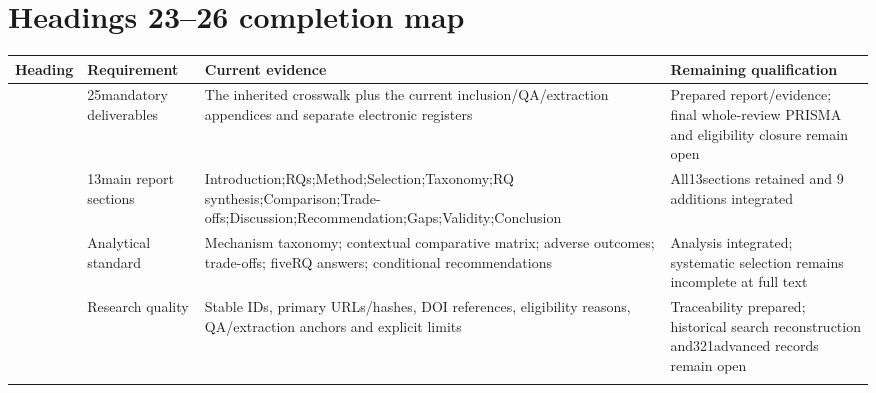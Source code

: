 \clearpage\section{Headings 23--26 completion map}
\begin{longtable}{>{\raggedright\arraybackslash}p{}>{\raggedright\arraybackslash}p{}>{\raggedright\arraybackslash}p{}>{\raggedright\arraybackslash}p{}}
\toprule
\textbf{Heading} & \textbf{Requirement} & \textbf{Current evidence} & \textbf{Remaining qualification}\\\midrule\endhead
23 & 25mandatory deliverables & The inherited crosswalk plus the current inclusion/QA/extraction appendices and separate electronic registers & Prepared report/evidence;\allowbreak{} final whole-review PRISMA and eligibility closure remain open\\\addlinespace
24 & 13main report sections & Introduction;\allowbreak{}RQs;\allowbreak{}Method;\allowbreak{}Selection;\allowbreak{}Taxonomy;\allowbreak{}RQ synthesis;\allowbreak{}Comparison;\allowbreak{}Trade-offs;\allowbreak{}Discussion;\allowbreak{}Recommendation;\allowbreak{}Gaps;\allowbreak{}Validity;\allowbreak{}Conclusion & All13sections retained and 9 additions integrated\\\addlinespace
25 & Analytical standard & Mechanism taxonomy;\allowbreak{} contextual comparative matrix;\allowbreak{} adverse outcomes;\allowbreak{} trade-offs;\allowbreak{} fiveRQ answers;\allowbreak{} conditional recommendations & Analysis integrated;\allowbreak{} systematic selection remains incomplete at full text\\\addlinespace
26 & Research quality & Stable IDs,\allowbreak{} primary URLs/hashes,\allowbreak{} DOI references,\allowbreak{} eligibility reasons,\allowbreak{} QA/extraction anchors and explicit limits & Traceability prepared;\allowbreak{} historical search reconstruction and321advanced records remain open\\\addlinespace
\bottomrule\end{longtable}
